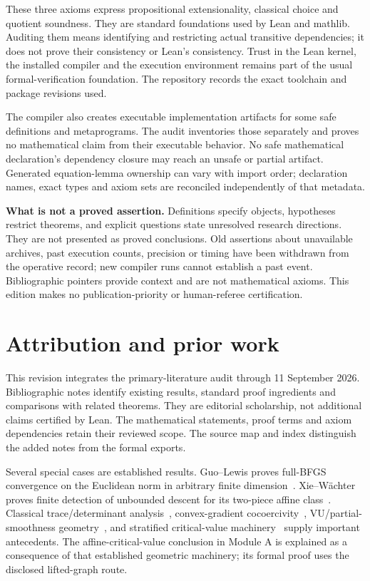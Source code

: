 These three axioms express propositional extensionality, classical choice and quotient soundness. They are standard foundations used by Lean and mathlib. Auditing them means identifying and restricting actual transitive dependencies; it does not prove their consistency or Lean's consistency. Trust in the Lean kernel, the installed compiler and the execution environment remains part of the usual formal-verification foundation. The repository records the exact toolchain and package revisions used.

The compiler also creates executable implementation artifacts for some safe definitions and metaprograms. The audit inventories those separately and proves no mathematical claim from their executable behavior. No safe mathematical declaration's dependency closure may reach an unsafe or partial artifact. Generated equation-lemma ownership can vary with import order; declaration names, exact types and axiom sets are reconciled independently of that metadata.

\textbf{What is not a proved assertion.} Definitions specify objects, hypotheses restrict theorems, and explicit questions state unresolved research directions. They are not presented as proved conclusions. Old assertions about unavailable archives, past execution counts, precision or timing have been withdrawn from the operative record; new compiler runs cannot establish a past event. Bibliographic pointers provide context and are not mathematical axioms. This edition makes no publication-priority or human-referee certification.

\chapter*{Attribution and prior work}
This revision integrates the primary-literature audit through 11 September 2026. Bibliographic notes identify existing results, standard proof ingredients and comparisons with related theorems. They are editorial scholarship, not additional claims certified by Lean. The mathematical statements, proof terms and axiom dependencies retain their reviewed scope. The source map and index distinguish the added notes from the formal exports.

Several special cases are established results. Guo--Lewis proves full-BFGS convergence on the Euclidean norm in arbitrary finite dimension~\cite[Corollary 4.2]{GL18}. Xie--W\"achter proves finite detection of unbounded descent for its two-piece affine class~\cite[Theorem IV.1]{XW}. Classical trace/determinant analysis~\cite{FND_N92,FND_BN89,FND_P76}, convex-gradient cocoercivity~\cite{WW}, VU/partial-smoothness geometry~\cite{geom_Lewis2002,LL}, and stratified critical-value machinery~\cite{BDLS} supply important antecedents. The affine-critical-value conclusion in Module A is explained as a consequence of that established geometric machinery; its formal proof uses the disclosed lifted-graph route.

